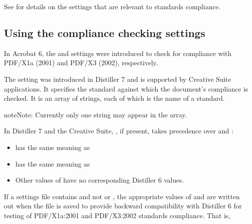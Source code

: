 \documentclass[letterpaper,12pt,english,openany,oneside]{sphinxmanual}
\begin{document}
See  for details on the settings that are relevant to standards compliance.




\subsection{Using the compliance checking settings}
\label{\detokenize{PDF_Create_UsingSettings:using-the-compliance-checking-settings}}
In Acrobat 6, the  and  settings were introduced to check for compliance with PDF/X\sphinxhyphen{}1a (2001) and PDF/X\sphinxhyphen{}3 (2002), respectively.

The  setting was introduced in Distiller 7 and is supported by Creative Suite applications. It specifies the standard against which the document’s compliance is checked. It is an array of strings, each of which is the name of a standard.

\begin{sphinxadmonition}{note}{Note:}
Currently only one string may appear in the array.
\end{sphinxadmonition}

In Distiller 7 and the Creative Suite,  , if present, takes precedence over  and  :
\begin{itemize}
\item {} 
 has the same meaning as 

\item {} 
 has the same meaning as 

\item {} 
Other values of  have no corresponding Distiller 6 values.

\end{itemize}

If a settings file contains  and not  or  , the appropriate values of  and  are written out when the file is saved to provide backward compatibility with Distiller 6 for testing of PDF/X\sphinxhyphen{}1a:2001 and PDF/X\sphinxhyphen{}3:2002 standards compliance. That is,
\end{document}
